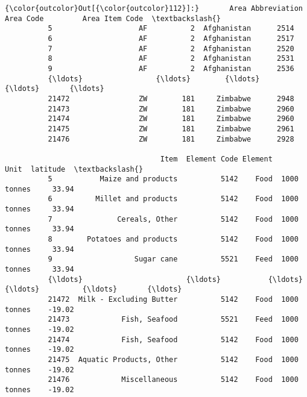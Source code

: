 \documentclass[11pt]{article}
\begin{document}
\begin{Verbatim}[commandchars=\\\{\}]
{\color{outcolor}Out[{\color{outcolor}112}]:}       Area Abbreviation  Area Code         Area Item Code  \textbackslash{}
          5                    AF          2  Afghanistan      2514   
          6                    AF          2  Afghanistan      2517   
          7                    AF          2  Afghanistan      2520   
          8                    AF          2  Afghanistan      2531   
          9                    AF          2  Afghanistan      2536   
          {\ldots}                 {\ldots}        {\ldots}          {\ldots}       {\ldots}   
          21472                ZW        181     Zimbabwe      2948   
          21473                ZW        181     Zimbabwe      2960   
          21474                ZW        181     Zimbabwe      2960   
          21475                ZW        181     Zimbabwe      2961   
          21476                ZW        181     Zimbabwe      2928   
          
                                    Item  Element Code Element         Unit  latitude  \textbackslash{}
          5           Maize and products          5142    Food  1000 tonnes     33.94   
          6          Millet and products          5142    Food  1000 tonnes     33.94   
          7               Cereals, Other          5142    Food  1000 tonnes     33.94   
          8        Potatoes and products          5142    Food  1000 tonnes     33.94   
          9                   Sugar cane          5521    Feed  1000 tonnes     33.94   
          {\ldots}                        {\ldots}           {\ldots}     {\ldots}          {\ldots}       {\ldots}   
          21472  Milk - Excluding Butter          5142    Food  1000 tonnes    -19.02   
          21473            Fish, Seafood          5521    Feed  1000 tonnes    -19.02   
          21474            Fish, Seafood          5142    Food  1000 tonnes    -19.02   
          21475  Aquatic Products, Other          5142    Food  1000 tonnes    -19.02   
          21476            Miscellaneous          5142    Food  1000 tonnes    -19.02   
          

\end{Verbatim}
\end{document}
